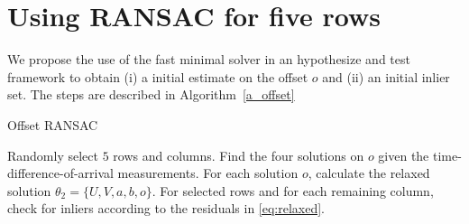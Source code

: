 \documentclass{article}
\newtheorem{algorithm1}{\noindent \textbf{Algorithm}}
\def\ie{\emph{i.e.\ }}
\begin{document}
\section{Using RANSAC for five rows}
\label{sec:ransac}
\vspace{-5pt}
We propose the use of the fast minimal solver in an hypothesize and test framework to obtain (i) a initial estimate on the offset $o$ and (ii) an initial inlier set.  The steps are described in Algorithm~\ref{a_offset}
\begin{algorithm}
\caption{Offset RANSAC}\label{a_offset}
\begin{algorithmic}[1]
\State Randomly select $5$ rows and columns. Find the four solutions on $o$ given the time-difference-of-arrival measurements. 
\State For each solution $o$, calculate the relaxed solution $\theta_2 = \{ U,V,a,b,o \}$.
\State For selected rows and for each remaining column, check for inliers according to the residuals in \eqref{eq:relaxed}.
\end{algorithmic}
\end{algorithm}







\vspace{-5pt}
\end{document}
